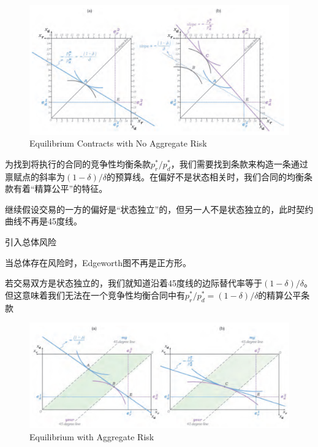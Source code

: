 \documentclass{article}
\begin{document}
\begin{figure}[H] %
	\centering %
	\includegraphics[width=1\textwidth]{17_6} %
	\caption{Equilibrium Contracts with No Aggregate Risk} %
	\label{Fig.main7} %
\end{figure}

为找到将执行的合同的竞争性均衡条款$ p_r^*/p_d^* $，我们需要找到条款来构造一条通过禀赋点的斜率为$ (1-\delta)/\delta $的预算线。在偏好不是状态相关时，我们合同的均衡条款有着“精算公平”的特征。

继续假设交易的一方的偏好是“状态独立”的，但另一人不是状态独立的，此时契约曲线不再是45度线。

\hspace*{\fill}

引入总体风险

当总体存在风险时，Edgeworth图不再是正方形。

若交易双方是状态独立的，我们就知道沿着45度线的边际替代率等于$ (1-\delta)/\delta $。但这意味着我们无法在一个竞争性均衡合同中有$ p_r^*/p_d^*=(1-\delta)/\delta $的精算公平条款

\begin{figure}[H] %
	\centering %
	\includegraphics[width=1\textwidth]{17_7} %
	\caption{Equilibrium with Aggregate Risk} %
	\label{Fig.main8} %
\end{figure}
\end{document}
